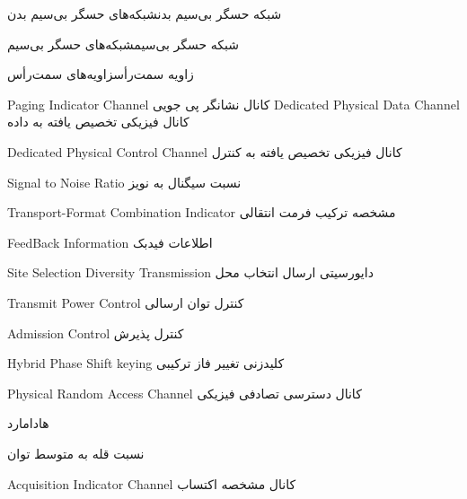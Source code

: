 {شبکه حسگر بی‌سیم بدن}{شبکه‌های حسگر بی‌سیم بدن}

{شبکه حسگر بی‌سیم}{شبکه‌های حسگر بی‌سیم}







{زاویه سمت‌رأس}{زاویه‌های سمت‌رأس}







{Paging Indicator Channel}
{کانال نشانگر پی جویی}{}
{Dedicated Physical Data Channel} 
{کانال فیزیکی تخصیص یافته به داده}{}

{Dedicated Physical Control Channel} 
{کانال فیزیکی تخصیص یافته به کنترل}{}

{Signal to Noise Ratio} 
{نسبت سیگنال به نویز}{}

{Transport-Format Combination Indicator} 
{مشخصه ترکیب فرمت انتقالی}{}



{FeedBack Information} 
{اطلاعات فیدبک}{}


{Site Selection Diversity Transmission} 
{دایورسیتی ارسال انتخاب محل}{}



{Transmit Power Control} 
{کنترل توان ارسالی}{}



{Admission Control} 
{کنترل پذیرش}{}


{Hybrid Phase Shift keying} 
{کلیدزنی تغییر فاز ترکیبی}{}
	

{Physical Random Access Channel} 
{کانال دسترسی تصادفی فیزیکی}{}


{هادامارد}{}

{نسبت قله به متوسط توان}{}

{Acquisition Indicator Channel}
	{کانال مشخصه اکتساب}{}


